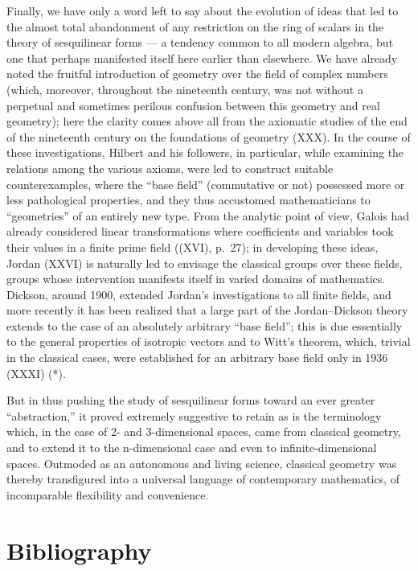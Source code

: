 Finally, we have only a word left to say about the evolution of ideas that led to the almost total abandonment of any restriction on the ring of scalars in the theory of sesquilinear forms — a tendency common to all modern algebra, but one that perhaps manifested itself here earlier than elsewhere. We have already noted the fruitful introduction of geometry over the field of complex numbers (which, moreover, throughout the nineteenth century, was not without a perpetual and sometimes perilous confusion between this geometry and real geometry); here the clarity comes above all from the axiomatic studies of the end of the nineteenth century on the foundations of geometry (XXX). In the course of these investigations, Hilbert and his followers, in particular, while examining the relations among the various axioms, were led to construct suitable counterexamples, where the “base field” (commutative or not) possessed more or less pathological properties, and they thus accustomed mathematicians to “geometries” of an entirely new type. From the analytic point of view, Galois had already considered linear transformations where coefficients and variables took their values in a finite prime field ((XVI), p.~27); in developing these ideas, Jordan (XXVI) is naturally led to envisage the classical groups over these fields, groups whose intervention manifests itself in varied domains of mathematics. Dickson, around 1900, extended Jordan's investigations to all finite fields, and more recently it has been realized that a large part of the Jordan–Dickson theory extends to the case of an absolutely arbitrary “base field”; this is due essentially to the general properties of isotropic vectors and to Witt's theorem, which, trivial in the classical cases, were established for an arbitrary base field only in 1936 (XXXI) (*).

But in thus pushing the study of sesquilinear forms toward an ever greater “abstraction,” it proved extremely suggestive to retain as is the terminology which, in the case of 2- and 3-dimensional spaces, came from classical geometry, and to extend it to the n-dimensional case and even to infinite-dimensional spaces. Outmoded as an autonomous and living science, classical geometry was thereby transfigured into a universal language of contemporary mathematics, of incomparable flexibility and convenience.

\section*{Bibliography}
{}

